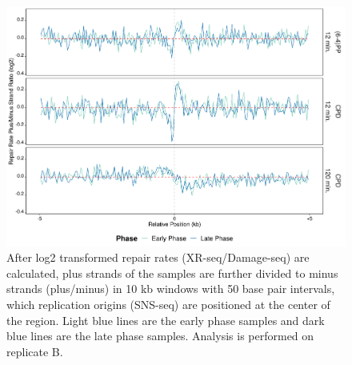 \begin{figure}[H]
\begin{center}
\includegraphics[width=\textwidth]{Chapters/7_appendix/figures/supfig59}
\caption[Repair rate plus/minus ratio of replication origins in 10 kb (replicate B).]{After log2 transformed repair rates (XR-seq/Damage-seq) are calculated, plus strands of the samples are further divided to minus strands (plus/minus) in 10 kb windows with 50 base pair intervals, which replication origins (SNS-seq) are positioned at the center of the region. Light blue lines are the early phase samples and dark blue lines are the late phase samples. Analysis is performed on replicate B.}
\label{supfig:rrpm10snsB}
\end{center}
\end{figure}

